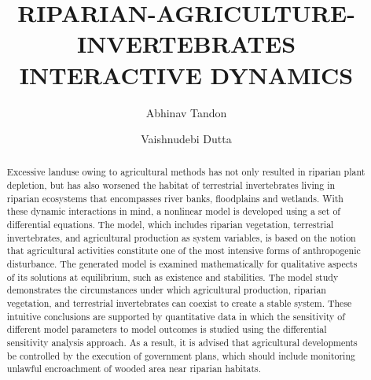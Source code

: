 \documentclass[12pt]{article}
\date{}
\author[1]{Abhinav Tandon}
\author[2]{Vaishnudebi Dutta}
\affil[1]{Corresponding Author\thanks{abhinav.abhi02@gmail.com}}
\affil[1,2]{Birla Institute of Technology Mesra, Ranchi - 835215, Jharkhand, INDIA}
\title{RIPARIAN-AGRICULTURE-INVERTEBRATES INTERACTIVE DYNAMICS}
\numberwithin{equation}{section}
\begin{document}
\maketitle
\vspace{-1cm}
\begin{abstract}
Excessive landuse owing to agricultural methods has not only resulted in riparian plant depletion, but has also worsened the habitat of terrestrial invertebrates living in riparian ecosystems that encompasses river banks, floodplains and wetlands. With these dynamic interactions in mind, a nonlinear model is developed using a set of differential equations. The model, which includes riparian vegetation, terrestrial invertebrates, and agricultural production as system variables, is based on the notion that agricultural activities constitute one of the most intensive forms of anthropogenic disturbance. The generated model is examined mathematically for qualitative aspects of its solutions at equilibrium, such as existence and stabilities. The model study demonstrates the circumstances under which agricultural production, riparian vegetation, and terrestrial invertebrates can coexist to create a stable system. These intuitive conclusions are supported by quantitative data in which the sensitivity of different model parameters to model outcomes is studied using the differential sensitivity analysis approach. As a result, it is advised that agricultural developments be controlled by the execution of government plans, which should include monitoring unlawful encroachment of wooded area near riparian habitats.
\end{abstract}
\end{document}
